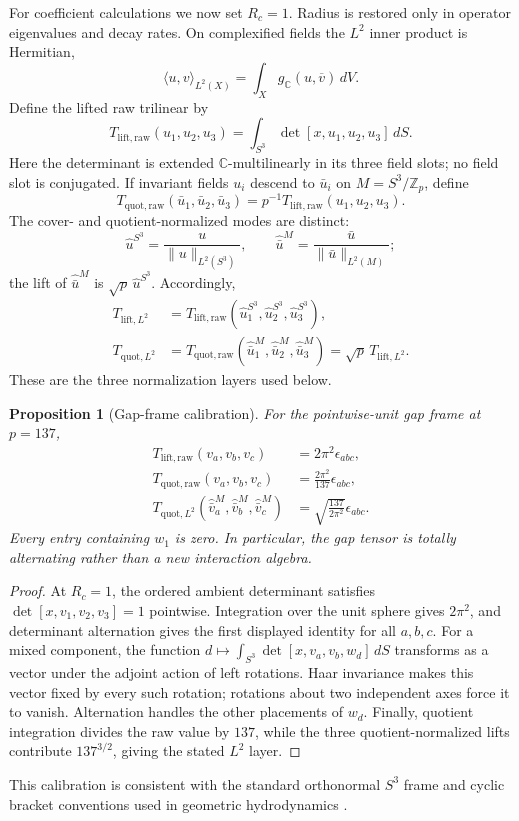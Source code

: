 \documentclass[12pt]{article}
\newtheorem{proposition}[theorem]{Proposition}
\theoremstyle{definition}
\theoremstyle{remark}
\newcommand{\ZZ}{\mathbb Z}
\begin{document}
For coefficient calculations we now set $R_c=1$.  Radius is restored only in
operator eigenvalues and decay rates.  On complexified fields the $L^2$
inner product is Hermitian,
\[
 \langle u,v\rangle_{L^2(X)}=\int_X g_{\mathbb C}(u,\overline v)\,dV.
\]
Define the lifted raw trilinear by
\[
 T_{\mathrm{lift,raw}}(u_1,u_2,u_3)
 =\int_{S^3}\det[x,u_1,u_2,u_3]\,dS.
\]
Here the determinant is extended $\mathbb C$-multilinearly in its three field
slots; no field slot is conjugated.  If invariant fields $u_i$ descend to
$\bar u_i$ on $M=S^3/\ZZ_p$, define
\[
 T_{\mathrm{quot,raw}}(\bar u_1,\bar u_2,\bar u_3)
 =p^{-1}T_{\mathrm{lift,raw}}(u_1,u_2,u_3).
\]
The cover- and quotient-normalized modes are distinct:
\[
 \widehat u^{S^3}=\frac{u}{\|u\|_{L^2(S^3)}},\qquad
 \widehat{\bar u}^{M}=\frac{\bar u}{\|\bar u\|_{L^2(M)}};
\]
the lift of $\widehat{\bar u}^{M}$ is $\sqrt p\,\widehat u^{S^3}$.
Accordingly,
\begin{align*}
 T_{\mathrm{lift},L^2}
   &=T_{\mathrm{lift,raw}}(\widehat u_1^{S^3},
      \widehat u_2^{S^3},\widehat u_3^{S^3}),\\
 T_{\mathrm{quot},L^2}
   &=T_{\mathrm{quot,raw}}(\widehat{\bar u}_1^M,
      \widehat{\bar u}_2^M,\widehat{\bar u}_3^M)
    =\sqrt p\,T_{\mathrm{lift},L^2}.
\end{align*}
These are the three normalization layers used below.

\begin{proposition}[Gap-frame calibration]\label{prop:gap-tensor}
For the pointwise-unit gap frame at $p=137$,
\begin{align*}
 T_{\mathrm{lift,raw}}(v_a,v_b,v_c)&=2\pi^2\epsilon_{abc},\\
 T_{\mathrm{quot,raw}}(v_a,v_b,v_c)&=\frac{2\pi^2}{137}\epsilon_{abc},\\
 T_{\mathrm{quot},L^2}(\widehat{\bar v}_a^M,
   \widehat{\bar v}_b^M,\widehat{\bar v}_c^M)
 &=\sqrt{\frac{137}{2\pi^2}}\epsilon_{abc}.
\end{align*}
Every entry containing $w_1$ is zero.  In particular, the gap tensor is
totally alternating rather than a new interaction algebra.
\end{proposition}
\begin{proof}
At $R_c=1$, the ordered ambient determinant satisfies
$\det[x,v_1,v_2,v_3]=1$ pointwise.  Integration over the unit sphere gives
$2\pi^2$, and determinant alternation gives the first displayed identity for
all $a,b,c$.  For a mixed component, the function
$d\mapsto\int_{S^3}\det[x,v_a,v_b,w_d]\,dS$ transforms as a vector under the
adjoint action of left rotations.  Haar invariance makes this vector fixed by
every such rotation; rotations about two independent axes force it to vanish.
Alternation handles the other placements of $w_d$.  Finally, quotient
integration divides the raw value by $137$, while the three quotient-normalized
lifts contribute $137^{3/2}$, giving the stated $L^2$ layer.
\end{proof}
This calibration is consistent with the standard orthonormal $S^3$ frame and
cyclic bracket conventions used in geometric hydrodynamics
\cite{ModinPreston2025}.
\end{document}
